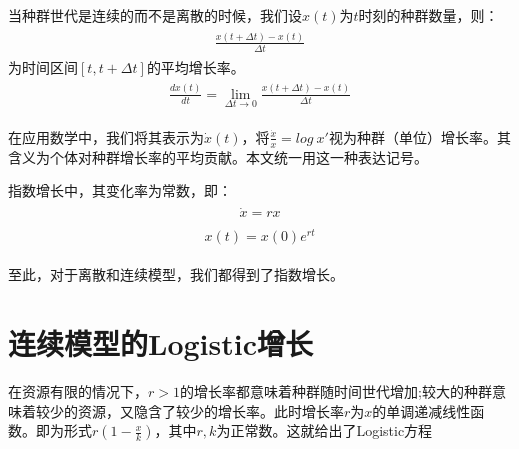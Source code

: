 当种群世代是连续的而不是离散的时候，我们设\begin{math}x(t)\end{math}为\begin{math}t\end{math}时刻的种群数量，则：
\begin{align*}
	\begin{split}
		\label{eq:feedforward}
		\frac{x\left ( t+\Delta t \right )-x\left ( t \right )}{\Delta t}
	\end{split}
\end{align*}
为时间区间\begin{math}\left [ t,t+\Delta t \right ]\end{math}的平均增长率。
\begin{align}
	\begin{split}
	\label{eq:feedforward}
	\frac{dx(t)}{dt}=\lim_{\Delta t\to 0}\frac{x(t+\Delta t)-x(t)}{\Delta t}
	\end{split}
\end{align}

在应用数学中，我们将其表示为\begin{math}\dot{x}(t)\end{math}，将\begin{math}\frac{\dot{x}}{x}={log\ x}'\end{math}视为种群（单位）增长率。其含义为个体对种群增长率的平均贡献。本文统一用这一种表达记号。

指数增长中，其变化率为常数，即：
\begin{align}
	\begin{split}
	\label{eq:feedforward}
	\dot{x}=rx
\end{split}
\end{align}
\begin{align}
	\begin{split}
	\label{eq:feedforward}
	x(t)=x(0)e^{rt}
\end{split}
\end{align}

至此，对于离散和连续模型，我们都得到了指数增长。


\section{连续模型的Logistic增长}
在资源有限的情况下，\begin{math}r>1\end{math}的增长率都意味着种群随时间世代增加;较大的种群意味着较少的资源，又隐含了较少的增长率。此时增长率\begin{math}r\end{math}为\begin{math}x\end{math}的单调递减线性函数。即为形式\begin{math}r(1-\frac{x}{k})\end{math}，其中\begin{math}r,k\end{math}为正常数。这就给出了Logistic方程


